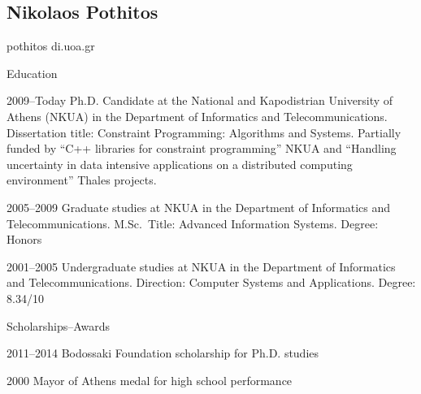 \documentclass[a4paper]{article}
\begin{document}
\begin{cv}{}

\begin{center}
  \section*{Nikolaos Pothitos}
  pothitos di.uoa.gr
\end{center}

\begin{cvlist}{Education}
  \item[2009--Today] Ph.D. Candidate at the National and
                     Kapodistrian University of Athens
                     (NKUA) in the Department of Informatics
                     and Telecommunications. Dissertation
                     title: \textsf{Constraint Programming:
                     Algorithms and Systems}. Partially
                     funded by ``C++ libraries for
                     constraint programming'' NKUA and
                     ``Handling uncertainty in data
                     intensive applications on a distributed
                     computing environment'' Thales
                     projects.
  \item[2005--2009] Graduate studies at NKUA in the
                    Department of Informatics and
                    Telecommunications. M.Sc.\ Title:
                    \textsf{Advanced Information Systems}.
                    Degree: Honors
  \item[2001--2005] Undergraduate studies at NKUA in the
                    Department of Informatics and
                    Telecommunications. Direction:
                    \textsf{Computer Systems and
                    Applications}. Degree: 8.34/10
\end{cvlist}

\begin{cvlist}{Scholarships--Awards}
  \item[2011--2014] Bodossaki Foundation scholarship for
                    Ph.D. studies
  \item[2000] Mayor of Athens medal for high school
              performance
\end{cvlist}

\vspace{1em}

\nocite{*}




\end{cv}
\end{document}

